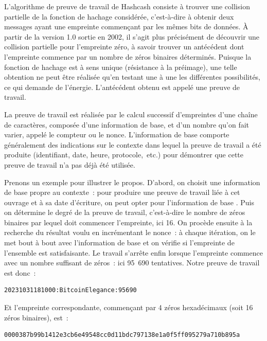 
L'algorithme de preuve de travail de Hashcash consiste à trouver une collision partielle de la fonction de hachage considérée, c'est-à-dire à obtenir deux messages ayant une empreinte commençant par les mêmes bits de données. À partir de la version 1.0 sortie en 2002, il s'agit plus précisément de découvrir une collision partielle pour l'empreinte zéro, à savoir trouver un antécédent dont l'empreinte commence par un nombre de zéros binaires déterminés. Puisque la fonction de hachage est à sens unique (résistance à la préimage), une telle obtention ne peut être réalisée qu'en testant une à une les différentes possibilités, ce qui demande de l'énergie. L'antécédent obtenu est appelé une preuve de travail.

La preuve de travail est réalisée par le calcul successif d'empreintes d'une chaîne de caractères, composée d'une information de base, et d'un nombre qu'on fait varier, appelé le compteur ou le nonce. L'information de base comporte généralement des indications sur le contexte dans lequel la preuve de travail a été produite (identifiant, date, heure, protocole,~etc.) pour démontrer que cette preuve de travail n'a pas déjà été utilisée.

Prenons un exemple pour illustrer le propos. D'abord, on choisit une information de base propre au contexte~: pour produire une preuve de travail liée à cet ouvrage et à sa date d'écriture, on peut opter pour l'information de base . Puis on détermine le degré de la preuve de travail, c'est-à-dire le nombre de zéros binaires par lequel doit commencer l'empreinte, ici 16. On procède ensuite à la recherche du résultat voulu en incrémentant le nonce~: à chaque itération, on le met bout à bout avec l'information de base et on vérifie si l'empreinte de l'ensemble est satisfaisante. Le travail s'arrête enfin lorsque l'empreinte commence avec un nombre suffisant de zéros~: ici 95~690 tentatives. Notre preuve de travail est donc~:

\begin{Verbatim}[fontsize=\footnotesize]
20231031181000:BitcoinElegance:95690
\end{Verbatim}

Et l'empreinte correspondante, commençant par 4 zéros hexadécimaux (soit 16 zéros binaires), est~:

\begin{Verbatim}[fontsize=\footnotesize]
0000387b99b1412e3cb6e49548cc0d11bdc797138e1a0f5ff095279a710b895a
\end{Verbatim}

